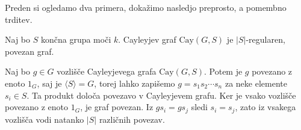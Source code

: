 Preden si ogledamo dva primera, dokažimo nasledjo preprosto, a pomembno trditev.

\begin{trditev}\label{trd_lastnosti_cayleyjevega_grafa}
    Naj bo $S$ končna grupa moči $k$. Cayleyjev graf $\text{Cay}(G, S)$ je $\lvert S \rvert$-regularen, povezan graf.
\end{trditev}
\begin{dokaz}
    Naj bo $g \in G$ vozlišče Cayleyjevega grafa $\text{Cay}(G, S)$. Potem je $g$ povezano z enoto $1_G$, saj je $\langle S \rangle = G$, torej lahko zapišemo
    $g = s_1 s_2 \cdots s_n$ za neke elemente $s_i \in S$. Ta produkt določa povezavo v Cayleyjevem grafu. Ker je vsako vozlišče povezano z enoto $1_G$, je graf povezan. Iz $g s_i = g s_j$ sledi $s_i = s_j$, zato iz vsakega vozlišča vodi natanko $\lvert S \rvert$ različnih povezav.
\end{dokaz}


